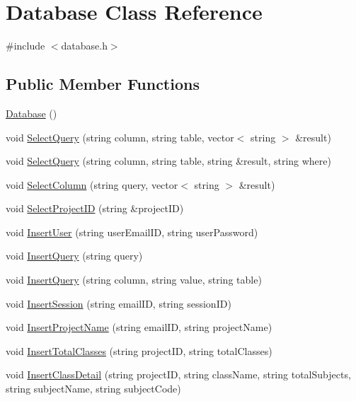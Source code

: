 \hypertarget{classDatabase}{\section{Database Class Reference}
\label{classDatabase}
}


{\ttfamily \#include $<$database.\-h$>$}

\subsection*{Public Member Functions}
\begin{DoxyCompactItemize}
\item 
\hyperlink{classDatabase_a4703c80e6969d33565ea340f768fdadf}{Database} ()
\item 
void \hyperlink{classDatabase_aec3d0f84e49a58a59f254c90193c1303}{Select\-Query} (string column, string table, vector$<$ string $>$ \&result)
\item 
void \hyperlink{classDatabase_a958467134aa40db133cdf6d46ab52c86}{Select\-Query} (string column, string table, string \&result, string where)
\item 
void \hyperlink{classDatabase_a6fb9e249cb97830af86c00804bb209a2}{Select\-Column} (string query, vector$<$ string $>$ \&result)
\item 
void \hyperlink{classDatabase_a20f7ccadac8f3b67d4344f7da4594eda}{Select\-Project\-I\-D} (string \&project\-I\-D)
\item 
void \hyperlink{classDatabase_a7070d93bf44c5f90504944f54607b9b0}{Insert\-User} (string user\-Email\-I\-D, string user\-Password)
\item 
void \hyperlink{classDatabase_a63d8c1af7507b1dcdc81a411f9a0b4b4}{Insert\-Query} (string query)
\item 
void \hyperlink{classDatabase_a513326ea43b2455177731fbc92c4bf4f}{Insert\-Query} (string column, string value, string table)
\item 
void \hyperlink{classDatabase_a478f862bd338a92b13c2899bb4e28843}{Insert\-Session} (string email\-I\-D, string session\-I\-D)
\item 
void \hyperlink{classDatabase_aae19d9dac16779519f94cc68e29cb57d}{Insert\-Project\-Name} (string email\-I\-D, string project\-Name)
\item 
void \hyperlink{classDatabase_ad6af2dc859cda41dcbdad9cd51f5c38b}{Insert\-Total\-Classes} (string project\-I\-D, string total\-Classes)
\item 
void \hyperlink{classDatabase_a45deae7ea496fccefb9bccd75ea5578a}{Insert\-Class\-Detail} (string project\-I\-D, string class\-Name, string total\-Subjects, string subject\-Name, string subject\-Code)

\end{DoxyCompactItemize}
